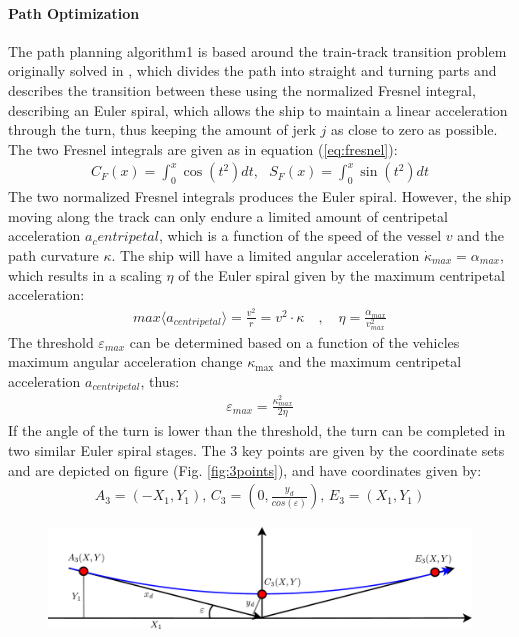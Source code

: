 \documentclass[a0,portrait]{a0poster}
\begin{document}
\begin{center}
{\paragraph{Path Optimization}
The path planning algorithm1 is based around the train-track transition problem originally solved in \cite{arthur}, which divides the path into straight and turning parts and describes the transition between these using the normalized Fresnel integral, describing an Euler spiral, which allows the ship to maintain a linear acceleration through the turn, thus keeping the amount of jerk $j$ as close to zero as possible. The two Fresnel integrals are given as in equation (\ref{eq:fresnel}):
\begin{align}
C_F(x) = \int_0^x \cos(t^2)dt,\,\,\,\,S_F(x) = \int_0^x \sin(t^2)dt
\label{eq:fresnel}
\end{align}
The two normalized Fresnel integrals produces the Euler spiral. However, the ship moving along the track can only endure a limited amount of centripetal acceleration $a_centripetal$, which is a function of the speed of the vessel $v$ and the path curvature $\kappa$. The ship will have a limited angular acceleration $\dot{\kappa}_{max} = \alpha_{max}$, which results in a scaling $\eta$ of the Euler spiral given by the maximum centripetal acceleration:
\begin{align}
max\langle a_{centripetal}\rangle = \frac{v^2}{r} = v^2 \cdot \kappa \quad , \quad \eta = \frac{\alpha_{max}}{v^2_{max}}
\end{align}
The threshold $\varepsilon_{max}$ can be determined based on a function of the vehicles maximum angular acceleration change $\kappa_\text{max}$ and the maximum centripetal acceleration $a_{centripetal}$, thus:
\begin{align}
\varepsilon_{max} = \frac{\kappa^2_{max}}{2\eta}
\end{align}
If the angle of the turn is lower than the threshold, the turn can be completed in two similar Euler spiral stages.
The 3 key points are given by the coordinate sets and are depicted on figure (Fig. \ref{fig:3points}), and have coordinates given by:
\begin{align}
A_3 = (-X_1,Y_1),\, C_3 = (0,\frac{y_d}{cos(\varepsilon)}),\, E_3 = (X_1,Y_1)
\end{align}
\begin{figure}
	\begin{center}
		\includegraphics[width=\threecolwidth]{img/3Points} %

\end{center}
\end{figure}}
\end{center}
\end{document}
